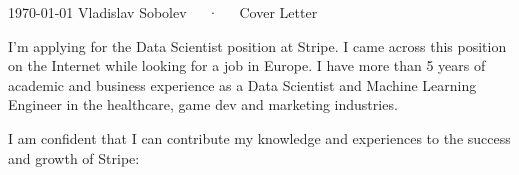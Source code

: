 \documentclass[11pt, a4paper]{awesome-cv}
\newcommand\companyname{Stripe}
\begin{document}
\makecvheader[R]

\makecvfooter
  {\today}
  {Vladislav Sobolev~~~·~~~Cover Letter}
  {}

\makelettertitle

\begin{cvletter}



I'm applying for the Data Scientist position at {\companyname}. I came across this position on the Internet while looking for a job in Europe. I have more than 5 years of academic and business experience as a Data Scientist and Machine Learning Engineer in the healthcare, game dev and marketing industries.


I am confident that I can contribute my knowledge and experiences to the success and growth of {\companyname}:

\bigskip
\begin{cvitems}
  

\end{cvitems}
\end{cvletter}
\end{document}
